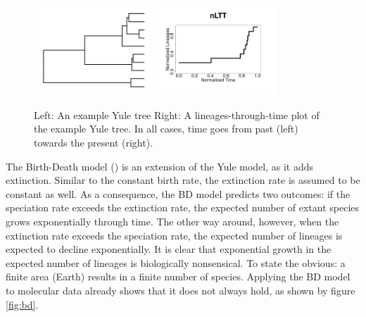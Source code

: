 \begin{figure}[H]
  \includegraphics[width=0.4\textwidth]{yule_tree.png}
  \includegraphics[width=0.4\textwidth]{yule_tree_nltt.png}
  \caption{
    Left: An example Yule tree
    Right: A lineages-through-time plot of the example Yule tree.
    In all cases, time goes from past (left) towards the present (right).
  }
  \label{fig:yule}
\end{figure}

The Birth-Death model (\cite{nee1994}) is an extension of the
Yule model, as it adds extinction.
Similar to the constant birth rate, the extinction rate is assumed
to be constant as well.
As a consequence, the BD model predicts two outcomes:
if the speciation rate exceeds the extinction rate,
the expected number of extant species grows exponentially through time. 
The other way around, however, when the extinction rate exceeds
the speciation rate, the expected number of lineages is expected to decline
exponentially.
It is clear that exponential growth in the expected number of lineages
is biologically nonsensical. 
To state the obvious: a finite area (Earth) results in a finite number of species. 
Applying the BD model to molecular data already shows that it does not
always hold, as shown by figure \ref{fig:bd}.

